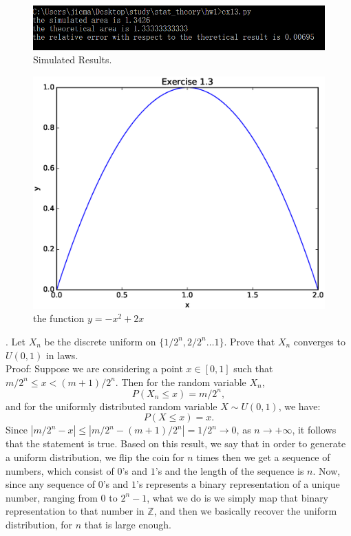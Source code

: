 \documentclass[11pt]{article} \pagestyle{plain}
\def\beq{\begin{equation}}
\def\eeq{\end{equation}}
\begin{document}
\begin{figure}[!htb]
	\includegraphics[width = \textwidth]{ex13result.png}
	\caption{Simulated Results.}
\end{figure}


\begin{figure}[!htb]
	\includegraphics[width = \textwidth, height = 0.5\textwidth]{ex13.eps}
	\caption{the function $y = -x^{2}+2x$}
\end{figure}
\pagebreak

. Let $X_{n}$ be the discrete uniform on $\{1/2^{n}, 2/2^{n}\dots 1\}$. Prove that $X_{n}$ converges to $U(0,1)$ in laws.\\

\noindent Proof: Suppose we are considering a point $x\in [0,1]$ such that $m/2^{n}\leq x<(m+1)/2^{n}$. Then for the random variable $X_{n}$, 
\beq P\left(X_{n}\leq x\right) = m/2^{n},\eeq and for the uniformly distributed random variable  $X\sim U(0,1)$, we have:
\beq P\left(X\leq x\right) = x.\eeq
Since $|m/2^{n} - x|\leq |m/2^{n}-(m+1)/2^{n}| = 1/2^{n} \to 0$, as $n \to +\infty$, it follows that the statement is true. Based on this result, we say that in order to generate a uniform distribution, we flip the coin for $n$ times then we get a sequence of numbers, which consist of $0$'s and $1$'s and the length of the sequence is $n$. Now, since any sequence of $0$'s and $1$'s represents a binary representation of a unique number, ranging from $0$ to $2^{n}-1$, what we do is we simply map that binary representation to that number in $\mathbb{Z}$, and then we basically recover the uniform distribution, for $n$ that is large enough.\\
\end{document}
